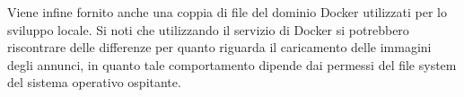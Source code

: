 \documentclass[a4paper,12pt]{article}
\begin{document}
Viene infine fornito anche una coppia di file del dominio Docker utilizzati per lo sviluppo locale. Si noti che utilizzando il servizio di Docker si potrebbero riscontrare delle
differenze per quanto riguarda il caricamento delle immagini degli annunci, in quanto tale comportamento dipende dai permessi del file system del sistema operativo ospitante.
\end{document}
